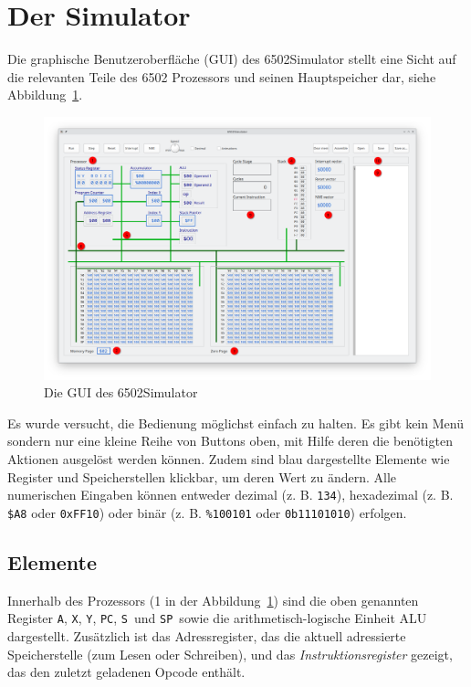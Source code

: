 \documentclass[11pt]{scrartcl}
\newcommand{\xreg}{\texttt{X}}
\newcommand{\yreg}{\texttt{Y}}
\newcommand{\acc}{\texttt{A}}
\newcommand{\stp}{\texttt{SP}}
\newcommand{\sreg}{\texttt{S}}
\newcommand{\pc}{\texttt{PC}}
\begin{document}
\newpage
\section{Der Simulator}
\label{sec:der-simulator}

Die graphische Benutzeroberfläche (GUI) des 6502Simulator stellt eine
Sicht auf die relevanten Teile des 6502 Prozessors und seinen
Hauptspeicher dar, siehe Abbildung~\ref{fig:gui}.

\begin{figure}
  \centering
  \includegraphics[width=\linewidth]{gui}
  \caption{Die GUI des 6502Simulator}
  \label{fig:gui}
\end{figure}

Es wurde versucht, die Bedienung möglichst einfach zu halten. Es gibt
kein Menü sondern nur eine kleine Reihe von Buttons oben, mit Hilfe
deren die benötigten Aktionen ausgelöst werden können. Zudem sind blau
dargestellte Elemente wie Register und Speicherstellen klickbar, um
deren Wert zu ändern. Alle numerischen Eingaben können entweder
dezimal (z. B. \lstinline!134!), hexadezimal (z. B. \lstinline!$A8!
oder \lstinline!0xFF10!)  oder binär (z. B. \lstinline!%100101! oder
\lstinline|0b11101010|) erfolgen.

\subsection{Elemente}
\label{sec:elemente}


Innerhalb des Prozessors (1 in der Abbildung~\ref{fig:gui}) sind die
oben genannten Register \acc, \xreg, \yreg, \pc, \sreg\ und \stp\
sowie die arithmetisch-logische Einheit ALU dargestellt. Zusätzlich
ist das Adressregister, das die aktuell adressierte Speicherstelle
(zum Lesen oder Schreiben), und das \emph{Instruktionsregister}
gezeigt, das den zuletzt geladenen Opcode enthält.
\end{document}
